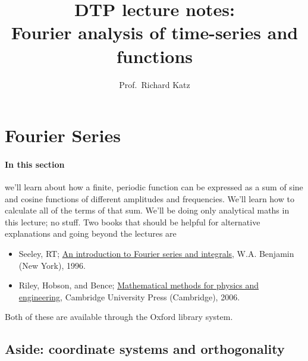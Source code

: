\documentclass[11pt,twoside,a4paper]{article}
\title{DTP lecture notes: \\
  Fourier analysis of time-series and functions}
\author{Prof.~Richard Katz}
\begin{document}
\maketitle{}

\section{Fourier Series}
\label{sec:fourierseries}

\paragraph{In this section} we'll learn about how a finite, periodic
function can be expressed as a sum of sine and cosine functions of
different amplitudes and frequencies. We'll learn how to calculate all
of the terms of that sum.  We'll be doing only analytical maths in
this lecture; no \Mlab stuff.  Two books that should be helpful for
alternative explanations and going beyond the lectures are
\begin{itemize}
\item Seeley, RT; \underline{An introduction to Fourier series and
    integrals}, W.A. Benjamin (New York), 1996.
\item Riley, Hobson, and Bence; \underline{Mathematical methods for
    physics and engineering}, Cambridge University Press (Cambridge),
  2006.
\end{itemize}
Both of these are available through the Oxford library system.

\subsection{Aside: coordinate systems and orthogonality}
\end{document}
